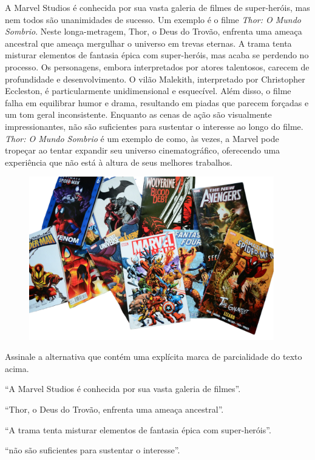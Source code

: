 \begin{myquote}
A Marvel Studios é conhecida por sua vasta galeria de filmes de super-heróis,
mas nem todos são unanimidades de sucesso. Um exemplo é o filme \textit{Thor: O Mundo
Sombrio}. Neste longa-metragem, Thor, o Deus do Trovão, enfrenta uma ameaça
ancestral que ameaça mergulhar o universo em trevas eternas. A trama tenta
misturar elementos de fantasia épica com super-heróis, mas acaba se perdendo
no processo. Os personagens, embora interpretados por atores talentosos,
carecem de profundidade e desenvolvimento. O vilão Malekith, interpretado por
Christopher Eccleston, é particularmente unidimensional e esquecível. Além
disso, o filme falha em equilibrar humor e drama, resultando em piadas que
parecem forçadas e um tom geral inconsistente. Enquanto as cenas de ação são
visualmente impressionantes, não são suficientes para sustentar o interesse ao
longo do filme. \textit{Thor: O Mundo Sombrio} é um exemplo de como, às vezes, a
Marvel pode tropeçar ao tentar expandir seu universo cinematográfico,
oferecendo uma experiência que não está à altura de seus melhores trabalhos.

\begin{figure}[H]
\centering
\includegraphics[width=0.95\textwidth]{./imgSAEB_7_POR/media/image48.png}
\end{figure}

\end{myquote}

Assinale a alternativa que contém uma explícita marca de parcialidade do texto acima.

\begin{escolha}
  
  \item ``A Marvel Studios é conhecida por sua vasta galeria de filmes''.
  
  \item ``Thor, o Deus do Trovão, enfrenta uma ameaça ancestral''.
  
  \item ``A trama tenta misturar elementos de fantasia épica com super-heróis''.
  
  \item ``não são suficientes para sustentar o interesse''.

\end{escolha}

